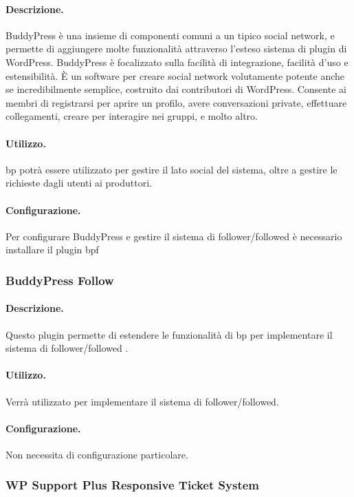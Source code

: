 \paragraph{Descrizione.}
BuddyPress è una insieme di componenti comuni a un tipico social network, e permette di aggiungere molte funzionalità attraverso l'esteso sistema di plugin di WordPress.
BuddyPress è focalizzato sulla facilità di integrazione, facilità d'uso e estensibilità. È un software per creare social network volutamente potente anche se incredibilmente semplice, costruito dai contributori di WordPress.
Consente ai membri di registrarsi per aprire un profilo, avere conversazioni private, effettuare collegamenti, creare per interagire nei gruppi, e molto altro. 
\paragraph{Utilizzo.}
\gls{bp} potrà essere utilizzato per gestire il lato social del sistema, oltre a gestire le richieste dagli utenti ai produttori.
\paragraph{Configurazione.}
Per configurare BuddyPress e gestire il sistema di follower/followed è necessario installare il plugin \gls{bpf}

\subsubsection{BuddyPress Follow}
\paragraph{Descrizione.}
Questo plugin permette di estendere le funzionalità di \gls{bp} per implementare il sistema di follower/followed .
\paragraph{Utilizzo.} Verrà utilizzato per implementare il sistema di follower/followed.
\paragraph{Configurazione.} Non necessita di configurazione particolare.

\subsubsection{WP Support Plus Responsive Ticket System}
